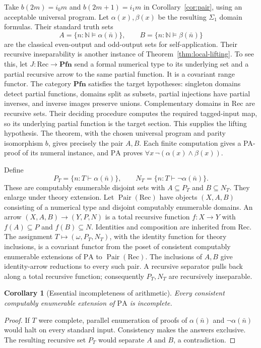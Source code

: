 \documentclass[11pt]{article}
\newtheorem{corollary}[theorem]{Corollary}
\newcommand{\N}{\mathbb N}
\newcommand{\PA}{\mathrm{PA}}
\newcommand{\Pfn}{\mathbf{Pfn}}
\begin{document}
Take $b(2m)=i_0m$ and $b(2m+1)=i_1m$ in
Corollary~\ref{cor:pair}, using an acceptable universal program.
Let $\alpha(x),\beta(x)$ be the resulting $\Sigma_1$ domain formulas.
Their standard truth sets
\[
 A=\{n:\N\models\alpha(\bar n)\},\qquad
 B=\{n:\N\models\beta(\bar n)\}
\]
are the classical even-output and odd-output sets for self-application.
Their recursive inseparability is another instance of
Theorem~\ref{thm:local-lifting}. To see this, let
$J:\mathrm{Rec}\to\Pfn$ send a formal numerical type to its underlying
set and a partial recursive arrow to the same partial function.
It is a covariant range functor. The category $\Pfn$ satisfies
the target hypotheses: singleton domains detect partial functions,
domains split as subsets, partial injections have partial inverses,
and inverse images preserve unions. Complementary domains in
$\mathrm{Rec}$ are recursive sets. Their deciding procedure computes
the required tagged-input map, so its underlying partial function is
the target section. This supplies the lifting hypothesis.
The theorem, with the chosen universal program and parity
isomorphism $b$, gives precisely the pair $A,B$.
Each finite computation gives a PA-proof of its numeral instance, and $\PA$ proves
$\forall x\,\neg(\alpha(x)\land\beta(x))$.

Define
\[
 P_T=\{n:T\vdash\alpha(\bar n)\},\qquad
 N_T=\{n:T\vdash\neg\alpha(\bar n)\}.
\]
These are computably enumerable disjoint sets with $A\subseteq P_T$
and $B\subseteq N_T$. They enlarge under theory extension.
Let $\operatorname{Pair}(\mathrm{Rec})$ have objects $(X,A,B)$ consisting
of a numerical type and disjoint computably enumerable domains.
An arrow $(X,A,B)\to(Y,P,N)$ is a total recursive function $f:X\to Y$
with $f(A)\subseteq P$ and $f(B)\subseteq N$. Identities and composition
are inherited from $\mathrm{Rec}$. The assignment
$T\mapsto(\omega,P_T,N_T)$, with the identity function for theory
inclusions, is a covariant functor from the poset of consistent
computably enumerable extensions of $\PA$ to
$\operatorname{Pair}(\mathrm{Rec})$.
The inclusions of $A,B$ give identity-arrow reductions to every such pair.
A recursive separator pulls back along a total recursive function;
consequently $P_T,N_T$ are recursively inseparable.

\begin{corollary}[Essential incompleteness of arithmetic]\label{cor:arithmetic}
Every consistent computably enumerable extension of $\PA$ is incomplete.
\end{corollary}
\begin{proof}
If $T$ were complete, parallel enumeration of proofs of
$\alpha(\bar n)$ and $\neg\alpha(\bar n)$ would halt on every standard
input. Consistency makes the answers exclusive. The resulting recursive
set $P_T$ would separate $A$ and $B$, a contradiction.
\end{proof}
\end{document}
